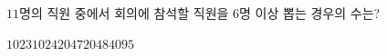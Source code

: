 $11$명의 직원 중에서 회의에 참석할 직원을 $6$명 이상 뽑는 경우의 수는?
\begin{choices32}{$1023$}{$1024$}{$2047$}{$2048$}{$4095$}\end{choices32}
